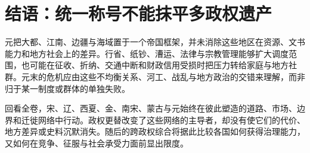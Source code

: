 \section{结语：统一称号不能抹平多政权遗产}

元把大都、江南、边疆与海域置于一个帝国框架，并未消除这些地区在资源、文书能力和地方社会上的差异。行省、纸钞、漕运、法律与宗教管理能够扩大调度范围，也可能在征收、折纳、交通中断和财政信用受损时把压力转给家庭与地方社群。元末的危机应由这些不均衡关系、河工、战乱与地方政治的交错来理解，而非归于某一制度或群体的单独失败。

回看全卷，宋、辽、西夏、金、南宋、蒙古与元始终在彼此塑造的道路、市场、边界和迁徙网络中行动。政权更替改变了这些网络的主导者，却没有使它们的代价、地方差异或史料沉默消失。随后的跨政权综合将据此比较各国如何获得治理能力，又如何在竞争、征服与社会承受力面前显出限度。
